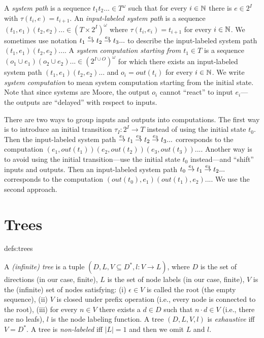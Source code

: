 A \emph{system path} is a sequence $t_1 t_2 ... \in T^\omega$
such that for every $i\in \mathbb{N}$ there is $e \in 2^I$ with $\tau(t_i,e) = t_{i+1}$.
An \emph{input-labeled system path} is a sequence $(t_1,e_1) (t_2,e_2) ... \in (T\times 2^I)^\omega$
where $\tau(t_i,e_i) = t_{i+1}$ for every $i\in \mathbb{N}$.
We sometimes use notation $t_1 \stackrel{{e_1}}{\rightarrow} t_2 \stackrel{{e_2}}{\rightarrow} t_3 ...$
to describe the input-labeled system path $(t_1,e_1) (t_2,e_2) ...$.
A \emph{system computation starting from $t_1 \in T$} is a sequence $(o_1\cup e_1) (o_2\cup e_2) ... \in (2^{I\cup O})^\omega$
for which there exists an input-labeled system path $(t_1,e_1) (t_2,e_2) ...$ 
and $o_i=out(t_i)$ for every $i \in \mathbb{N}$.
We write \emph{system computation} to mean system computation starting from the initial state.
Note that since systems are Moore,
the output $o_i$ cannot ``react'' to input $e_i$---%
the outputs are ``delayed'' with respect to inputs.

\begin{remark}\label{rem:inputs-shift}
There are two ways to group inputs and outputs into computations.
The first way is to introduce an initial transition $\tau_I: 2^I \to T$
instead of using the initial state $t_0$.
Then the input-labeled system path $\stackrel{{e_1}}{\rightarrow} t_1 \stackrel{{e_2}}{\rightarrow} t_2 \stackrel{{e_3}}{\rightarrow} t_3 ...$
corresponds to the computation $(e_1, out(t_1)) (e_2, out(t_2)) (e_3, out(t_3)) ...$.
Another way is to avoid using the initial transition---use the initial state $t_0$ instead---and ``shift'' inputs and outputs.
Then an input-labeled system path $t_0 \stackrel{{e_1}}{\rightarrow} t_1 \stackrel{{e_2}}{\rightarrow} t_2 ...$
corresponds to the computation $(out(t_0), e_1) (out(t_1), e_2) ...$.
We use the second approach.
\end{remark}



\toclesslab\section{Trees}{defs:trees}

A \emph{(infinite) tree} is a tuple $(D, L, V \subseteq D^*, l:V \to L)$,
where
\li
\- $D$ is the set of directions (in our case, finite),
\- $L$ is the set of node labels (in our case, finite),
\- $V$ is the (infinite) set of nodes satisfying:
   (i) $\epsilon \in V$ is called the root (the empty sequence),
  (ii) $V$ is closed under prefix operation (i.e., every node is connected to the root),
 (iii) for every $n \in V$ there exists a $d \in D$ such that $n\cdot d \in V$
       (i.e., there are no leafs),
\- $l$ is the node labeling function.
\il
A tree $(D,L,V,l)$ is \emph{exhaustive} iff $V=D^*$.
A tree is \emph{non-labeled} iff $|L|=1$ and then we omit $L$ and $l$.

